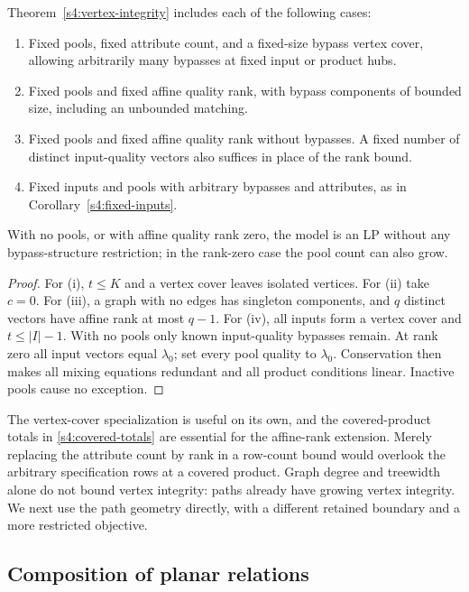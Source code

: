 \begin{corollary}
\label{s4:structural-corollaries}
Theorem~\ref{s4:vertex-integrity} includes each of the following cases:
\begin{enumerate}[label=(\roman*)]
 \item Fixed pools, fixed attribute count, and a fixed-size bypass
 vertex cover, allowing arbitrarily many bypasses at fixed input or
 product hubs.
 \item Fixed pools and fixed affine quality rank, with bypass components
 of bounded size, including an unbounded matching.
 \item Fixed pools and fixed affine quality rank without bypasses.
 A fixed number of distinct input-quality vectors also suffices in
 place of the rank bound.
 \item Fixed inputs and pools with arbitrary bypasses and attributes,
 as in Corollary~\ref{s4:fixed-inputs}.
\end{enumerate}
With no pools, or with affine quality rank zero, the model is an LP
without any bypass-structure restriction; in the rank-zero case the
pool count can also grow.
\end{corollary}
\begin{proof}
For (i), $t\le K$ and a vertex cover leaves isolated vertices. For (ii)
take $c=0$. For (iii), a graph with no edges has singleton components,
and $q$ distinct vectors have affine rank at most $q-1$. For (iv), all
inputs form a vertex cover and $t\le|I|-1$. With no pools only known
input-quality bypasses remain. At rank zero all input vectors equal
$\lambda_0$; set every pool quality to $\lambda_0$. Conservation then
makes all mixing equations redundant and all product conditions linear.
Inactive pools cause no exception.
\end{proof}

The vertex-cover specialization is useful on its own, and the
covered-product totals in \eqref{s4:covered-totals} are essential for
the affine-rank extension. Merely replacing the attribute count by
rank in a row-count bound would overlook the arbitrary specification
rows at a covered product. Graph degree and treewidth alone do not
bound vertex integrity: paths already have growing vertex integrity.
We next use the path geometry directly, with a different retained
boundary and a more restricted objective.

\subsection{Composition of planar relations}\label{s4:planar}

